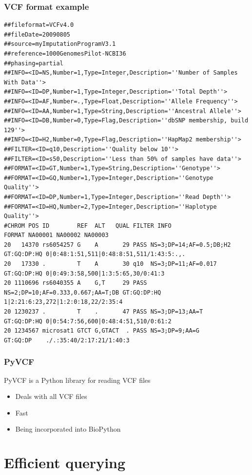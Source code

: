 \documentclass[slidestop]{beamer}
\begin{document}
\begin{frame}[fragile]
  \frametitle{VCF format example}
  {\tiny
  \begin{verbatim}
##fileformat=VCFv4.0
##fileDate=20090805
##source=myImputationProgramV3.1
##reference=1000GenomesPilot-NCBI36
##phasing=partial
##INFO=<ID=NS,Number=1,Type=Integer,Description=''Number of Samples With Data''>
##INFO=<ID=DP,Number=1,Type=Integer,Description=''Total Depth''>
##INFO=<ID=AF,Number=.,Type=Float,Description=''Allele Frequency''>
##INFO=<ID=AA,Number=1,Type=String,Description=''Ancestral Allele''>
##INFO=<ID=DB,Number=0,Type=Flag,Description=''dbSNP membership, build 129''>
##INFO=<ID=H2,Number=0,Type=Flag,Description=''HapMap2 membership''>
##FILTER=<ID=q10,Description=''Quality below 10''>
##FILTER=<ID=s50,Description=''Less than 50% of samples have data''>
##FORMAT=<ID=GT,Number=1,Type=String,Description=''Genotype''>
##FORMAT=<ID=GQ,Number=1,Type=Integer,Description=''Genotype Quality''>
##FORMAT=<ID=DP,Number=1,Type=Integer,Description=''Read Depth''>
##FORMAT=<ID=HQ,Number=2,Type=Integer,Description=''Haplotype Quality''>
#CHROM POS ID        REF  ALT   QUAL FILTER INFO                  FORMAT NA00001 NA00002 NA00003
20   14370 rs6054257 G    A       29 PASS NS=3;DP=14;AF=0.5;DB;H2 GT:GQ:DP:HQ 0|0:48:1:51,511|0:48:8:51,511/1:43:5:.,.
20   17330 .         T    A       30 q10  NS=3;DP=11;AF=0.017     GT:GQ:DP:HQ 0|0:49:3:58,500|1:3:5:65,30/0:41:3
20 1110696 rs6040355 A    G,T     29 PASS NS=2;DP=10;AF=0.333,0.667;AA=T;DB GT:GQ:DP:HQ 1|2:21:6:23,272|1:2:0:18,22/2:35:4
20 1230237 .         T    .       47 PASS NS=3;DP=13;AA=T         GT:GQ:DP:HQ 0|0:54:7:56,600|0:48:4:51,510/0:61:2
20 1234567 microsat1 GTCT G,GTACT  . PASS NS=3;DP=9;AA=G          GT:GQ:DP    ./.:35:40/2:17:21/1:40:3
  \end{verbatim}}
\end{frame}

\begin{frame}
  \frametitle{PyVCF}
  PyVCF is a Python library for reading VCF files
  \begin{itemize}
    \item Deals with all VCF files
    \item Fast
    \item Being incorporated into BioPython
  \end{itemize}
\end{frame}

\section{Efficient querying}
\end{document}
